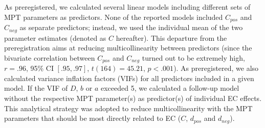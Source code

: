 \documentclass[
  man,floatsintext]{apa6}
\begin{document}
As preregistered, we calculated several linear models including different sets of MPT parameters as predictors.
None of the reported models included \(C_{pos}\) and \(C_{neg}\) as separate predictors; instead, we used the individual mean of the two parameter estimates (denoted as \(C\) hereafter).
This departure from the preregistration aims at reducing multicollinearity between predictors (since the bivariate correlation between \(C_{pos}\) and \(C_{neg}\) turned out to be extremely high, \(r = .96\), 95\% CI \([.95, .97]\), \(t(164) = 45.21\), \(p < .001\)).
As preregistered, we also calculated variance inflation factors (VIFs) for all predictors included in a given model.
If the VIF of \(D\), \(b\) or \(a\) exceeded 5, we calculated a follow-up model without the respective MPT parameter(s) as predictor(s) of individual EC effects.
This analytical strategy was adopted to reduce multicollinearity with the MPT parameters that should be most directly related to EC (\(C\), \(d_{pos}\) and \(d_{neg}\)).
\end{document}
